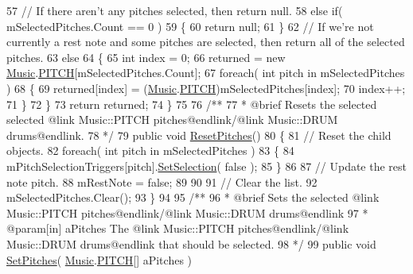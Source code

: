 \begin{DoxyCodeInclude}
57         \textcolor{comment}{// If there aren't any pitches selected, then return null.}
58         \textcolor{keywordflow}{else} \textcolor{keywordflow}{if}( mSelectedPitches.Count == 0 )
59         \{
60             \textcolor{keywordflow}{return} null;
61         \}
62         \textcolor{comment}{// If we're not currently a rest note and some pitches are selected, then return all of the
       selected pitches.}
63         \textcolor{keywordflow}{else}
64         \{
65             \textcolor{keywordtype}{int} index = 0;
66             returned = \textcolor{keyword}{new} \hyperlink{class_music}{Music}.\hyperlink{group___music_enums_ga508f69b199ea518f935486c990edac1d}{PITCH}[mSelectedPitches.Count];
67             \textcolor{keywordflow}{foreach}( \textcolor{keywordtype}{int} pitch \textcolor{keywordflow}{in} mSelectedPitches )
68             \{
69                 returned[index] = (\hyperlink{class_music}{Music}.\hyperlink{group___music_enums_ga508f69b199ea518f935486c990edac1d}{PITCH})mSelectedPitches[index];
70                 index++;
71             \}
72         \}
73         \textcolor{keywordflow}{return} returned;
74     \}
75 \textcolor{comment}{}
76 \textcolor{comment}{    /**}
77 \textcolor{comment}{     * @brief Resets the selected selected @link Music::PITCH pitches@endlink/@link Music::DRUM
       drums@endlink.}
78 \textcolor{comment}{    */}
79     \textcolor{keyword}{public} \textcolor{keywordtype}{void} \hyperlink{group___s_c___p_s_c_pub_func_ga678ef561c5418e4bf43a5f9ed753f0f0}{ResetPitches}()
80     \{
81         \textcolor{comment}{// Reset the child objects.}
82         \textcolor{keywordflow}{foreach}( \textcolor{keywordtype}{int} pitch \textcolor{keywordflow}{in} mSelectedPitches )
83         \{
84             mPitchSelectionTriggers[pitch].\hyperlink{group___s_c___p_s_t_pub_func_ga267db9aed38ba33ad44c26c84a1757df}{SetSelection}( \textcolor{keyword}{false} );
85         \}
86 
87         \textcolor{comment}{// Update the rest note pitch.}
88         mRestNote = \textcolor{keyword}{false};
89 
90 
91         \textcolor{comment}{// Clear the list.}
92         mSelectedPitches.Clear();
93     \}
94 \textcolor{comment}{}
95 \textcolor{comment}{    /**}
96 \textcolor{comment}{     * @brief Sets the selected @link Music::PITCH pitches@endlink/@link Music::DRUM drums@endlink}
97 \textcolor{comment}{     * @param[in] aPitches The @link Music::PITCH pitches@endlink/@link Music::DRUM drums@endlink that
       should be selected.}
98 \textcolor{comment}{    */}
99     \textcolor{keyword}{public} \textcolor{keywordtype}{void} \hyperlink{group___s_c___p_s_c_pub_func_ga0b85aab924084ebb49be4f64ad6f81e5}{SetPitches}( \hyperlink{class_music}{Music}.\hyperlink{group___music_enums_ga508f69b199ea518f935486c990edac1d}{PITCH}[] aPitches )

\end{DoxyCodeInclude}
